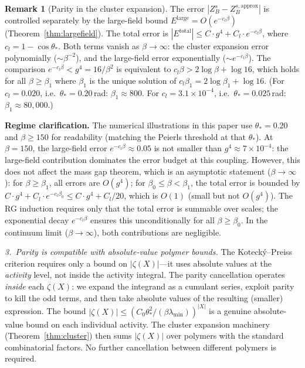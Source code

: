 \documentclass[11pt]{article}
\theoremstyle{definition}
\newtheorem{remark}[theorem]{Remark}
\begin{document}
\begin{remark}[Parity in the cluster expansion]
The error $|Z_B^s - Z_B^{s,\mathrm{approx}}|$ is controlled
separately by the large-field bound $E^{\mathrm{large}}
=O(e^{-c_l\beta})$ (Theorem~\ref{thm:largefield}).
The total error is
$|E^{\mathrm{total}}|\le C\cdot g^4 + C_l\cdot e^{-c_l\beta}$,
where $c_l=1-\cos\theta_*$.  Both terms vanish as
$\beta\to\infty$: the cluster expansion error polynomially
($\sim\beta^{-2}$), and the large-field error exponentially
($\sim e^{-c_l\beta}$).
The comparison $e^{-c_l\beta}<g^4=16/\beta^2$ is equivalent to
$c_l\beta>2\log\beta+\log 16$, which holds for all
$\beta\ge\beta_1$ where $\beta_1$ is the unique solution of
$c_l\beta_1=2\log\beta_1+\log 16$.
(For $c_l=0.020$, i.e.\ $\theta_*=0.20$\,rad:
$\beta_1\approx 800$.
For $c_l=3.1\times 10^{-4}$, i.e.\ $\theta_*=0.025$\,rad:
$\beta_1\approx 80{,}000$.)

\textbf{Regime clarification.}
The numerical illustrations in this paper use $\theta_*=0.20$
and $\beta\ge 150$ for readability (matching the Peierls threshold
at that $\theta_*$).  At $\beta=150$, the large-field error
$e^{-c_l\beta}\approx 0.05$ is not smaller than $g^4\approx 7\times
10^{-4}$: the large-field contribution dominates the error budget
at this coupling.  However, this does not affect the mass gap
theorem, which is an asymptotic statement ($\beta\to\infty$):
for $\beta\ge\beta_1$, all errors are $O(g^4)$; for
$\beta_0\le\beta<\beta_1$, the total error is bounded by
$C\cdot g^4+C_l\cdot e^{-c_l\beta_0}\le C\cdot g^4+C_l/20$,
which is $O(1)$ (small but not $O(g^4)$).  The RG induction
requires only that the total error is summable over scales;
the exponential decay $e^{-c_l\beta}$ ensures this
unconditionally for all $\beta\ge\beta_0$.
In the continuum limit ($\beta\to\infty$), both contributions
are negligible.

\emph{3.~Parity is compatible with absolute-value polymer bounds.}
The Koteck\'y--Preiss criterion requires only a bound on
$|\zeta(X)|$---it uses absolute values at the \emph{activity}
level, not inside the activity integral.  The parity cancellation
operates \emph{inside} each $\zeta(X)$: we expand the integrand
as a cumulant series, exploit parity to kill the odd terms, and
then take absolute values of the resulting (smaller) expression.
The bound $|\zeta(X)|\le(C_0\theta_*^2/(\beta\lambda_{\min}))^{|X|}$
is a genuine absolute-value bound on each individual activity.
The cluster expansion machinery (Theorem~\ref{thm:cluster}) then
sums $|\zeta(X)|$ over polymers with the standard combinatorial
factors.  No further cancellation between different polymers
is required.


\end{remark}
\end{document}

